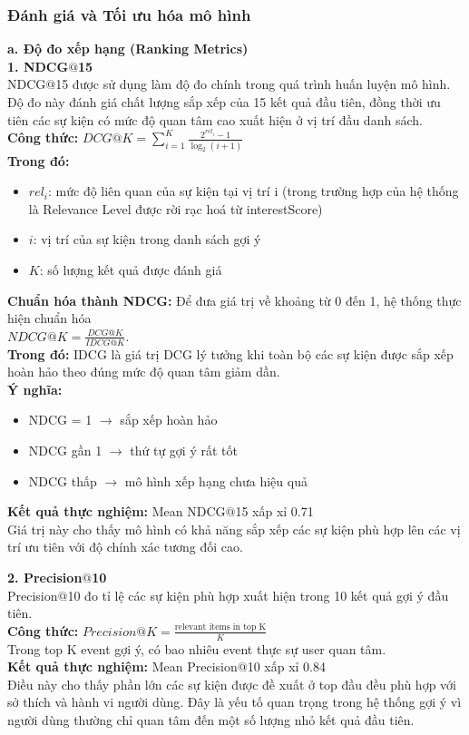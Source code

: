 \subsubsection{Đánh giá và Tối ưu hóa mô hình}
\textbf{a. Độ đo xếp hạng (Ranking Metrics)}\\
\textbf{1. NDCG$@$15}\\
NDCG$@$15 được sử dụng làm độ đo chính trong quá trình huấn luyện mô hình. Độ đo này đánh giá chất lượng sắp xếp của 15 kết quả đầu tiên, đồng thời ưu tiên các sự kiện có mức độ quan tâm cao xuất hiện ở vị trí đầu danh sách.\\
\textbf{Công thức:} $DCG@K = \sum_{i=1}^{K} \frac{2^{rel_i} - 1}{\log_2(i + 1)}$ \\
\textbf{Trong đó:}
\begin{itemize}
    \item[-] $rel_i$: mức độ liên quan của sự kiện tại vị trí i (trong trường hợp của hệ thống là Relevance Level được rời rạc hoá từ interestScore)
    \item[-] $i$: vị trí của sự kiện trong danh sách gợi ý
    \item[-] $K$: số lượng kết quả được đánh giá
\end{itemize}
\textbf{Chuẩn hóa thành NDCG:} Để đưa giá trị về khoảng từ 0 đến 1, hệ thống thực hiện chuẩn hóa \\
$NDCG@K = \frac{DCG@K}{IDCG@K}$.\\
\textbf{Trong đó:} IDCG là giá trị DCG lý tưởng khi toàn bộ các sự kiện được sắp xếp hoàn hảo theo đúng mức độ quan tâm giảm dần.\\
\textbf{Ý nghĩa:}
\begin{itemize}
    \item[-] NDCG = 1 $\rightarrow$ sắp xếp hoàn hảo
    \item[-] NDCG gần 1 $\rightarrow$ thứ tự gợi ý rất tốt
    \item[-] NDCG thấp $\rightarrow$ mô hình xếp hạng chưa hiệu quả
\end{itemize}
\textbf{Kết quả thực nghiệm:} Mean NDCG$@$15 xấp xỉ 0.71\\
Giá trị này cho thấy mô hình có khả năng sắp xếp các sự kiện phù hợp lên các vị trí ưu tiên với độ chính xác tương đối cao.

\textbf{2. Precision$@$10}\\
Precision$@$10 đo tỉ lệ các sự kiện phù hợp xuất hiện trong 10 kết quả gợi ý đầu tiên.\\
\textbf{Công thức:} $Precision@K = \frac{\text{relevant items in top K}}{K}$\\
Trong top K event gợi ý, có bao nhiêu event thực sự user quan tâm.\\
\textbf{Kết quả thực nghiệm:} Mean Precision$@$10 xấp xỉ 0.84\\
Điều này cho thấy phần lớn các sự kiện được đề xuất ở top đầu đều phù hợp với sở thích và hành vi người dùng. Đây là yếu tố quan trọng trong hệ thống gợi ý vì người dùng thường chỉ quan tâm đến một số lượng nhỏ kết quả đầu tiên.

